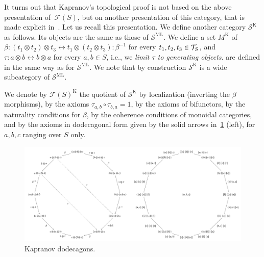 It turns out that Kapranov's topological proof is not based on the above presentation of~$\mathcal{F}(S)$, but on another presentation of this category, that is made explicit in~\cite[Sec.~2]{baralicSimplePermutoassociahedron2019}. 
Let us recall this presentation. 
We define another category $\mathcal{S}^{\mathrm{K}}$ as follows. Its objects are the same as those of $\mathcal{S}^{\mathrm{ML}}$. We define a set $M^{\mathrm{K}}$ of  $\beta: (t_1 \otimes t_2) \otimes t_3 \leftrightarrow t_1 \otimes (t_2\otimes t_3) : \beta^{-1}$ for every $t_1,t_2,t_3  \in {\cal T}_S$, and $\tau: a\otimes b \leftrightarrow b \otimes a$ for every $a,b \in S$, i.e., we \emph{limit $\tau$ to generating objects}.
 are defined in the same way as for $\mathcal{S}^{\mathrm{ML}}$.
We note that by construction $\mathcal{S}^{\mathrm{K}}$ is a wide subcategory of $\mathcal{S}^{\mathrm{ML}}$.
\begin{definition}
    \label{def:free-Kap}
    We denote  by $\mathcal{F}(S)^{\mathrm{K}}$ the quotient of $\mathcal{S}^{\mathrm{K}}$ by localization (inverting the $\beta$ morphisms), by the axioms $\tau_{a,b}\circ \tau_{b,a}=1$, by the axioms of bifunctors, by the naturality conditions for $\beta$, by the coherence conditions of  monoidal categories, and by the axioms in dodecagonal form given by the solid arrows in~\cref{fig:dodecagon} (left), for $a,b,c$ ranging over $S$ only.
\end{definition}

\begin{figure}[h!]
	\centerline{\includegraphics[scale=.5]{figures/dodecagons.png}}
	\caption{Kapranov dodecagons.}
    \label{fig:dodecagon}
\end{figure}


